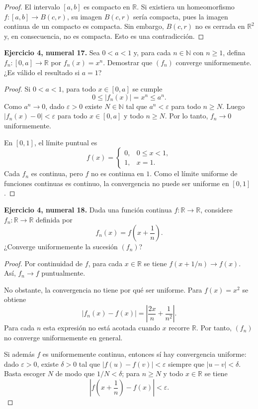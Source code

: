 \documentclass[11pt]{article}
\newcommand{\R}{\mathbb{R}}
\newcommand{\N}{\mathbb{N}}
\begin{document}
\begin{proof}
El intervalo $[a,b]$ es compacto en $\R$. Si existiera un homeomorfismo $f:[a,b]\to B(c,r)$, su imagen $B(c,r)$ sería compacta, pues la imagen continua de un compacto es compacta. Sin embargo, $B(c,r)$ no es cerrada en $\R^2$ y, en consecuencia, no es compacta. Esto es una contradicción.
\end{proof}

\textbf{Ejercicio 4, numeral 17.} Sea $0<a<1$ y, para cada $n\in\N$ con $n\ge1$, defina $f_n:[0,a]\to\R$ por $f_n(x)=x^n$. Demostrar que $(f_n)$ converge uniformemente. ¿Es válido el resultado si $a=1$?

\begin{proof}
Si $0<a<1$, para todo $x\in[0,a]$ se cumple
\[
0\le |f_n(x)|=x^n\le a^n.
\]
Como $a^n\to0$, dado $\varepsilon>0$ existe $N\in\N$ tal que $a^n<\varepsilon$ para todo $n\ge N$. Luego $|f_n(x)-0|<\varepsilon$ para todo $x\in[0,a]$ y todo $n\ge N$. Por lo tanto, $f_n\to0$ uniformemente.

En $[0,1]$, el límite puntual es
\[
f(x)=\begin{cases}0,&0\le x<1,\\1,&x=1.\end{cases}
\]
Cada $f_n$ es continua, pero $f$ no es continua en $1$. Como el límite uniforme de funciones continuas es continuo, la convergencia no puede ser uniforme en $[0,1]$.
\end{proof}

\textbf{Ejercicio 4, numeral 18.} Dada una función continua $f:\R\to\R$, considere $f_n:\R\to\R$ definida por
\[
f_n(x)=f\left(x+\frac1n\right).
\]
¿Converge uniformemente la sucesión $(f_n)$?

\begin{proof}
Por continuidad de $f$, para cada $x\in\R$ se tiene $f(x+1/n)\to f(x)$. Así, $f_n\to f$ puntualmente.

No obstante, la convergencia no tiene por qué ser uniforme. Para $f(x)=x^2$ se obtiene
\[
|f_n(x)-f(x)|=\left|\frac{2x}{n}+\frac1{n^2}\right|.
\]
Para cada $n$ esta expresión no está acotada cuando $x$ recorre $\R$. Por tanto, $(f_n)$ no converge uniformemente en general.

Si además $f$ es uniformemente continua, entonces sí hay convergencia uniforme: dado $\varepsilon>0$, existe $\delta>0$ tal que $|f(u)-f(v)|<\varepsilon$ siempre que $|u-v|<\delta$. Basta escoger $N$ de modo que $1/N<\delta$; para $n\ge N$ y todo $x\in\R$ se tiene
\[
\left|f\left(x+\frac1n\right)-f(x)\right|<\varepsilon.
\]
\end{proof}
\end{document}

